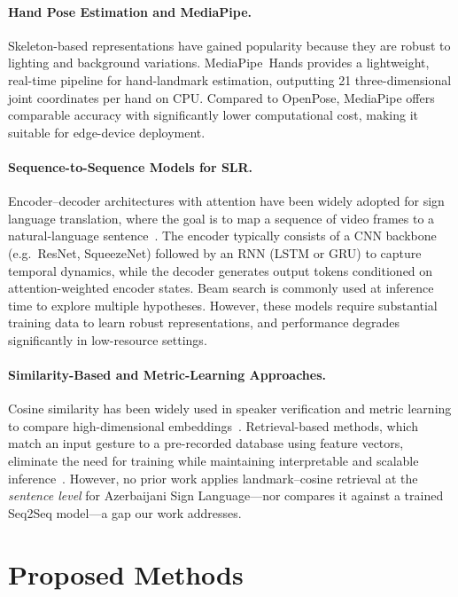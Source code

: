 \documentclass[runningheads]{llncs}
\begin{document}
\paragraph{Hand Pose Estimation and MediaPipe.}
Skeleton-based representations have gained popularity because they
are robust to lighting and background variations.
MediaPipe~Hands provides a lightweight, real-time pipeline for
hand-landmark estimation, outputting 21 three-dimensional joint
coordinates per hand on CPU.
Compared to OpenPose, MediaPipe offers comparable accuracy with
significantly lower computational cost, making it suitable for
edge-device deployment.

\paragraph{Sequence-to-Sequence Models for SLR.}
Encoder--decoder architectures with attention have been widely
adopted for sign language translation, where the goal is to map a
sequence of video frames to a natural-language
sentence~\cite{camgoz2018neural}.
The encoder typically consists of a CNN backbone (e.g.\ ResNet,
SqueezeNet) followed by an RNN (LSTM or GRU) to capture temporal
dynamics, while the decoder generates output tokens conditioned on
attention-weighted encoder states.
Beam search is commonly used at inference time to explore multiple
hypotheses.
However, these models require substantial training data to learn
robust representations, and performance degrades significantly in
low-resource settings.

\paragraph{Similarity-Based and Metric-Learning Approaches.}
Cosine similarity has been widely used in speaker verification and
metric learning to compare high-dimensional
embeddings~\cite{dehak2010cosine,zhang2020deep,zhu2020orthogonality}.
Retrieval-based methods, which match an input gesture to a pre-recorded
database using feature vectors, eliminate the need for training while
maintaining interpretable and scalable
inference~\cite{draganov2024hidden,weber2025timepoint}.
However, no prior work applies landmark--cosine retrieval at the
\emph{sentence level} for Azerbaijani Sign Language—nor compares it
against a trained Seq2Seq model—a gap our work addresses.

\section{Proposed Methods}\label{sec:method}
\end{document}
